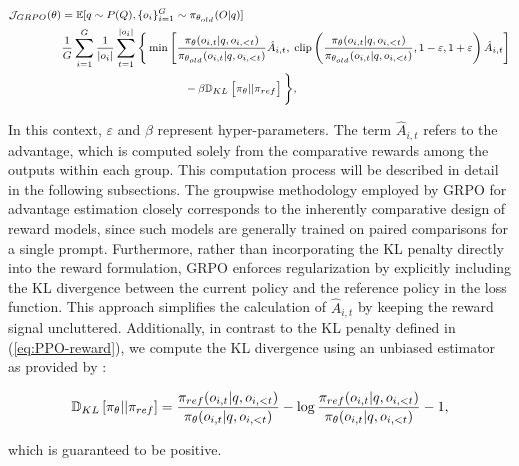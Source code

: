 \begin{itemize}[topsep=0pt]
\begin{itemize}[topsep=0pt]
\begin{equation}
\footnotesize
\begin{split}
    \mathcal{J}_{GRPO}(\theta) &= \mathbb{E}{[q \sim P(Q), \{o_i\}_{i=1}^G \sim \pi_{\theta_{old}}(O|q)]}  \\
    & \frac{1}{G} \sum_{i=1}^G \frac{1}{|o_i|} \sum_{t=1}^{|o_i|} \Bigg\{ \min \Bigg[ \frac{\pi_\theta(o_{i,t} | q, o_{i,<t})}{\pi_{\theta_{old}}(o_{i,t} | q, o_{i,<t})} \hat{A}_{i,t}, \; \text{clip} \left( \frac{\pi_\theta(o_{i,t} | q, o_{i,<t})}{\pi_{\theta_{old}}(o_{i,t} | q, o_{i,<t})}, 1 - \varepsilon, 1 + \varepsilon \right)\hat{A}_{i,t} \Bigg] \\
    & \hspace{3.3cm} - \beta \mathbb{D}_{KL}\left[\pi_{\theta} || \pi_{ref}\right] \Bigg\},
\end{split}
\label{eq:GRPO-obj}
\end{equation}

In this context, $\varepsilon$ and $\beta$ represent hyper-parameters. The term $\hat{A}_{i,t}$ refers to the advantage, which is computed solely from the comparative rewards among the outputs within each group. This computation process will be described in detail in the following subsections. The groupwise methodology employed by GRPO for advantage estimation closely corresponds to the inherently comparative design of reward models, since such models are generally trained on paired comparisons for a single prompt. Furthermore, rather than incorporating the KL penalty directly into the reward formulation, GRPO enforces regularization by explicitly including the KL divergence between the current policy and the reference policy in the loss function. This approach simplifies the calculation of $\hat{A}_{i,t}$ by keeping the reward signal uncluttered. Additionally, in contrast to the KL penalty defined in (\ref{eq:PPO-reward}), we compute the KL divergence using an unbiased estimator as provided by \citet{kl_approx}:

\begin{equation}
\small
    \mathbb{D}_{KL}\left[\pi_{\theta} || \pi_{ref}\right] = \frac{\pi_{ref}(o_{i,t}|q,o_{i,<t})}{\pi_{\theta}(o_{i,t}|q,o_{i,<t})}- \log\frac{\pi_{ref}(o_{i,t}|q,o_{i,<t})}{\pi_{\theta}(o_{i,t}|q,o_{i,<t})} - 1,
\end{equation}

which is guaranteed to be positive.


\end{itemize}
\end{itemize}
